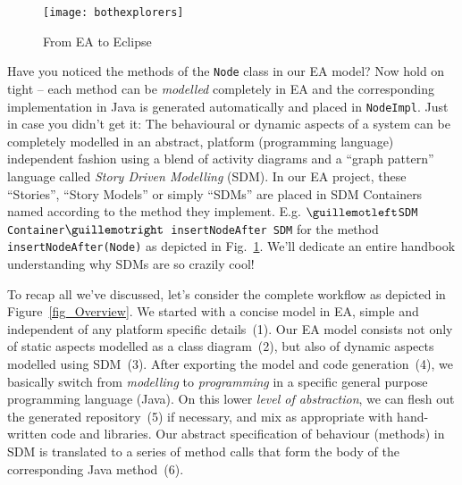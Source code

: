 \newpage
\visHeader

\begin{figure}[htbp]
    \centering
  \texttt{[image: bothexplorers]}
    \caption{From EA to Eclipse}
    \label{fig_fromEAtoEclipse}
\end{figure}

Have you noticed the methods of the \texttt{Node} class in our EA model? 
Now hold on tight -- each method can be \emph{modelled} completely in EA and the corresponding implementation in Java is generated automatically and placed in \texttt{NodeImpl}.  
Just in case you didn't get it: The behavioural or dynamic aspects of a system can be completely modelled in an abstract, platform (programming language) independent fashion using a blend of activity  diagrams and a ``graph pattern'' language called \textit{Story Driven Modelling} (SDM).  
In our EA project, these ``Stories'', ``Story Models'' or simply ``SDMs'' are  placed in SDM Containers named according to the method they implement.  
E.g.  \texttt{$\guillemotleft$SDM Container$\guillemotright$ insertNodeAfter SDM} for the method  \texttt{insertNodeAfter(Node)} as depicted in
Fig.~\ref{fig_fromEAtoEclipse}.  
We'll dedicate an entire handbook understanding why SDMs are so  {\huge crazily} cool!
 
To recap all we've discussed, let's consider the complete workflow as depicted in Figure~\ref{fig_Overview}. 
We started with a concise model in EA, simple and independent of any platform specific details~(1).  
Our EA model consists not only of static aspects modelled as a class diagram~(2), but also of dynamic
aspects modelled using SDM~(3).  After exporting the model and code generation~(4), we basically switch from \emph{modelling} to \emph{programming} in a specific general purpose programming language (Java).  
On this lower \emph{level of abstraction}, we can flesh out the generated repository~(5) if necessary, and mix as appropriate with hand-written code and libraries.  Our abstract specification of behaviour (methods) in SDM is translated to a series of method calls that form the body of the corresponding Java method~(6).